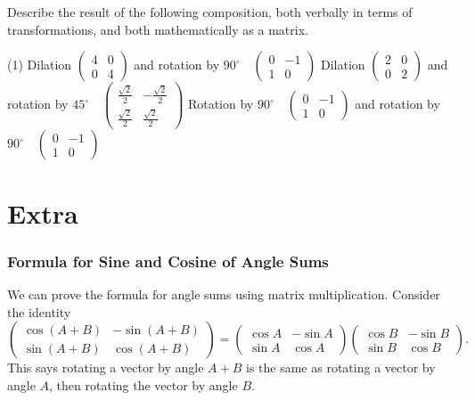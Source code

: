 \begin{frame}
\begin{exercisebox}{}{}
Describe the result of the following composition, both verbally in terms of transformations, and both mathematically as a matrix.
\begin{tasks}(1)
\task Dilation $\begin{pmatrix} 4 & 0 \\ 0 & 4 \end{pmatrix}$ and rotation by $90^{\circ} \quad \begin{pmatrix} 0 & -1\\ 1& 0 \end{pmatrix}$
\task Dilation $\begin{pmatrix} 2 & 0 \\ 0 & 2 \end{pmatrix}$ and rotation by $45^{\circ} \quad \begin{pmatrix} \frac{\sqrt{2}}{2} & -\frac{\sqrt{2}}{2} \\ \frac{\sqrt{2}}{2} & \frac{\sqrt{2}}{2} \end{pmatrix}$
\task Rotation by $90^{\circ} \quad \begin{pmatrix} 0 & -1 \\ 1 & 0 \end{pmatrix}$ and rotation by $90^{\circ} \quad \begin{pmatrix} 0 & -1\\ 1& 0 \end{pmatrix}$
\end{tasks}
\end{exercisebox}
\end{frame}


\section{Extra}
\frame{\sectionpage}

\begin{frame}
\frametitle{Formula for Sine and Cosine of Angle Sums}
We can prove the formula for angle sums using matrix multiplication. Consider the identity
\[\begin{pmatrix} \cos (A+B) & -\sin (A+B) \\ \sin (A+B) & \cos (A+B) \end{pmatrix} =  \begin{pmatrix} \cos A & -\sin A \\ \sin A & \cos A \end{pmatrix} \begin{pmatrix} \cos B & -\sin B \\ \sin B & \cos B \end{pmatrix}.\]
This says rotating a vector by angle $A+B$ is the same as rotating a vector by angle $A$, then rotating the vector by angle $B$. 

\end{frame}

